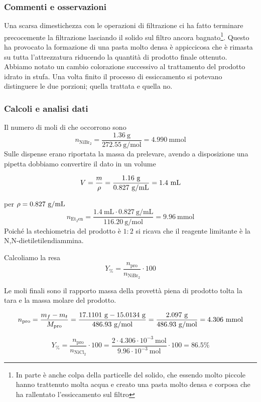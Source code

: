 \subsubsection{Commenti e osservazioni}
Una scarsa dimestichezza con le operazioni di filtrazione ci ha fatto terminare precocemente la filtrazione lasciando il solido sul filtro ancora bagnato\footnote{In parte è anche colpa della particelle del solido, che essendo molto piccole hanno trattenuto molta acqua e creato una pasta molto densa e corposa che ha rallentato l'essiccamento sul filtro}. Questo ha provocato la formazione di una pasta molto densa è appiccicosa che è rimasta su tutta l'attrezzatura riducendo la quantità di prodotto finale ottenuto.
Abbiamo notato un cambio colorazione successivo al trattamento del prodotto idrato in stufa. Una volta finito il processo di essiccamento si potevano distinguere le due porzioni; quella trattata e quella no.
\subsubsection{Calcoli e analisi dati}

Il numero di moli di  che occorrono sono
$$
n_{\mathrm{NiBr}_2}=\frac{1.36 \mathrm{~g}}{272.55 \mathrm{~g} / \mathrm{mol}}=4.990 \mathrm{~mmol}
$$
Sulle dispense erano riportata la massa da prelevare, avendo a disposizione una pipetta dobbiamo convertire il dato in un volume

\[ V = \frac{m}{\rho} = \frac{1.16\mathrm{\ g}}{0.827 \mathrm{\ g/mL}} = 1.4 \mathrm{\ mL} \]


per  $\rho = 0.827 \mathrm{\ g/mL}$
$$
n_{\mathrm{Et}_2 \mathrm{en}}=\frac{1.4 \mathrm{~mL} \cdot 0.827 \mathrm{~g} / \mathrm{mL}}{116.20 \mathrm{~g} / \mathrm{mol}}=9.96 \mathrm{~mmol}
$$
Poiché la stechiometria del prodotto è $1: 2$ si ricava che il reagente limitante è la N,N-dietiletilendiammina. 

Calcoliamo la resa 
\[ Y_\% = \frac{n_\text{pro}}{n_{\mathrm{NiBr}_2}}\cdot 100 \]

Le moli finali sono il rapporto massa della provettà piena di prodotto tolta la tara e la massa molare del prodotto.

\[ n_\text{pro} = \frac{m_{f} - m_{t}}{M_\text{pro}} 
 = \frac{ 17.1101\mathrm{\ g} - 15.0134 \mathrm{\ g}}{ 486.93 \mathrm{\ g/mol}} =  \frac{2.097 \mathrm{~g}}{486.93 \mathrm{~g} / \mathrm{mol}}=4.306 \mathrm{\ mmol}\]

\[ Y_\% = \frac{n_\text{pro}}{n_{\mathrm{NiCl}_2}}\cdot 100  = \frac{2 \cdot 4.306 \cdot 10^{-3} \mathrm{~mol}}{9.96 \cdot 10^{-3} \mathrm{~mol}} \cdot 100 =86.5 \%\]



